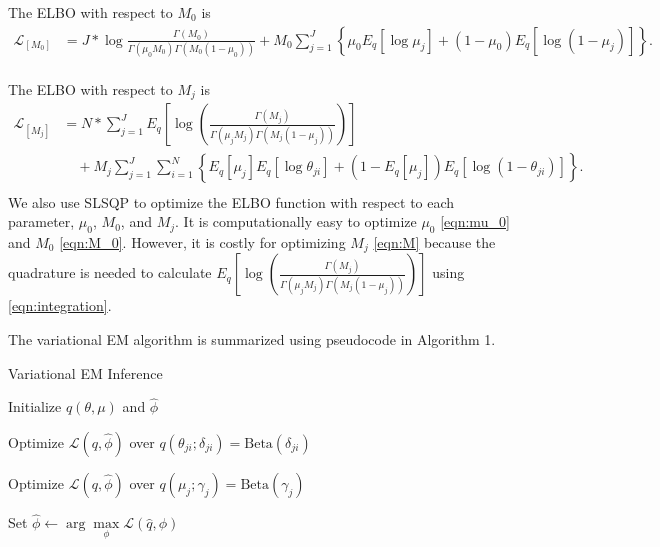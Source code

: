 \documentclass[11pt,reqno]{amsart}
\begin{document}
The ELBO with respect to $ M_0 $ is
\begin{equation}\label{eqn:M_0}
\begin{split}
\mathcal{L}_{[M_0]}
&=J* \log \frac{ \Gamma(M_0) } { \Gamma(\mu_0 M_0) \Gamma(M_0 (1-\mu_0))}
+ M_0 \sum_{j=1}^{J} \left\lbrace \mu_0E_q  \left[ \log \mu_j \right] + ( 1 - \mu_0) E_q  \left[ \log (1 - \mu_j)\right]\right\rbrace.  \\
\end{split}
\end{equation}


The ELBO with respect to $M_j$ is
\begin{equation}\label{eqn:M}
\begin{split}
\mathcal{L}_{{[M_j]}}
&= N* \sum_{j=1}^{J} E_q  \left[ \log \left( \frac{ \Gamma(M_j) } { \Gamma(\mu_j M_j) \Gamma(M_j (1-\mu_j)) }\right) \right] \\
&\quad + M_j \sum_{j=1}^{J} \sum_{i=1}^{N} \left\lbrace E_q \left[ \mu_j \right] E_q \left[ \log \theta_{ji} \right] + \left( 1 - E_q\left[ \mu_j \right]  \right) E_q\left[ \log \left( 1 - \theta_{ji}\right) \right] \right\rbrace. \\
\end{split}
\end{equation}
We also use SLSQP to optimize the ELBO function with respect to each parameter, $\mu_0$, $M_0$, and $M_j$.
It is computationally easy to optimize $\mu_0$ \eqref{eqn:mu_0} and $M_0$ \eqref{eqn:M_0}.
However, it is costly for optimizing $M_j$ \eqref{eqn:M} because the quadrature is needed to calculate $ E_q\left[ \log \left( \frac{ \Gamma(M_j) } { \Gamma(\mu_j M_j) \Gamma(M_j (1-\mu_j)) }\right)\right] $ using \eqref{eqn:integration}.

The variational EM algorithm is summarized using pseudocode in Algorithm 1.
\begin{algorithm}[ht]
  \caption{Variational EM Inference}

  \begin{algorithmic}[1]

  \State Initialize $q(\theta, \mu)$ and $\hat{\phi}$

  \Repeat

	\Repeat

			\State Optimize $\mathcal{L}(q, \hat{\phi})$ over $q(\theta_{ji}; \delta_{ji}) = \text{Beta} (\delta_{ji})$
			\EndFor
		\EndFor

            \State Optimize $\mathcal{L}(q, \hat{\phi})$ over $q(\mu_j; \gamma_j) = \text{Beta} (\gamma_j)$
        \EndFor


    \State Set $\hat{\phi} \leftarrow \arg \max\limits_{\phi}
            \mathcal{L}(\hat{q},\phi)$

  \end{algorithmic}

\end{algorithm}
%
\end{document}
